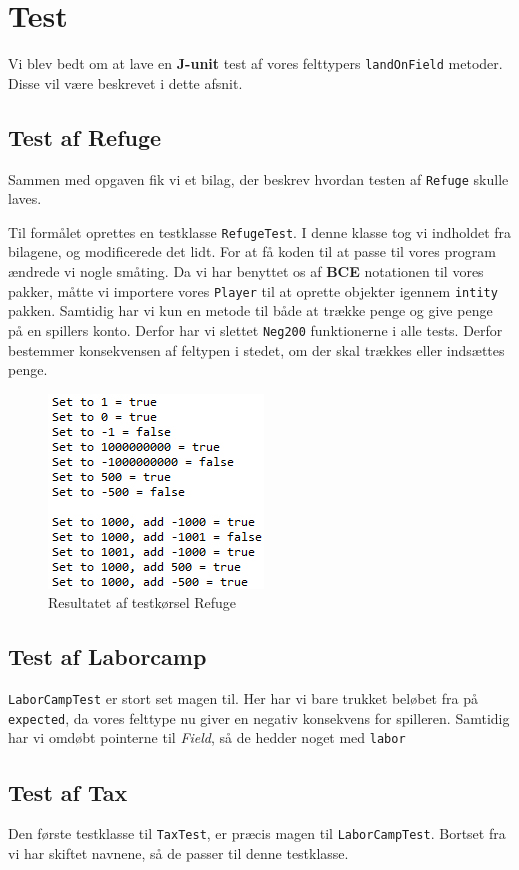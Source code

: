 \section{Test}
Vi blev bedt om at lave en \textbf{J-unit} test af vores felttypers \texttt{landOnField} metoder. Disse vil være beskrevet i dette afsnit.
\subsection{Test af Refuge}
Sammen med opgaven fik vi et bilag, der beskrev hvordan testen af \texttt{Refuge} skulle laves.


Til formålet oprettes en testklasse \texttt{RefugeTest}. I denne klasse tog vi indholdet fra bilagene, og modificerede det lidt. For at få koden til at passe til vores program ændrede vi nogle småting. Da vi har benyttet os af \textbf{BCE} notationen til vores pakker, måtte vi importere vores \texttt{Player} til at oprette objekter igennem \texttt{intity} pakken. Samtidig har vi kun en metode til både at trække penge og give penge på en spillers konto. Derfor har vi slettet \texttt{Neg200} funktionerne i  alle tests. Derfor bestemmer konsekvensen af feltypen i stedet, om der skal trækkes eller indsættes penge.
\begin{figure}[!ht]
\centering
\includegraphics[scale=0.4]{test-illustrationer1.jpg}
\caption[<Text for the list of figures>]{Resultatet af testkørsel Refuge}
\label{fig:testrefuge} 
\end{figure}
\subsection{Test af Laborcamp}
\texttt{LaborCampTest} er stort set magen til. Her har vi bare trukket beløbet fra på \texttt{expected}, da vores felttype nu giver en negativ konsekvens for spilleren. Samtidig har vi omdøbt pointerne til \textit{Field}, så de hedder noget med \texttt{labor}
\subsection{Test af Tax}
Den første testklasse til \texttt{TaxTest}, er præcis magen til \texttt{LaborCampTest}. Bortset fra vi har skiftet navnene, så de passer til denne testklasse.
